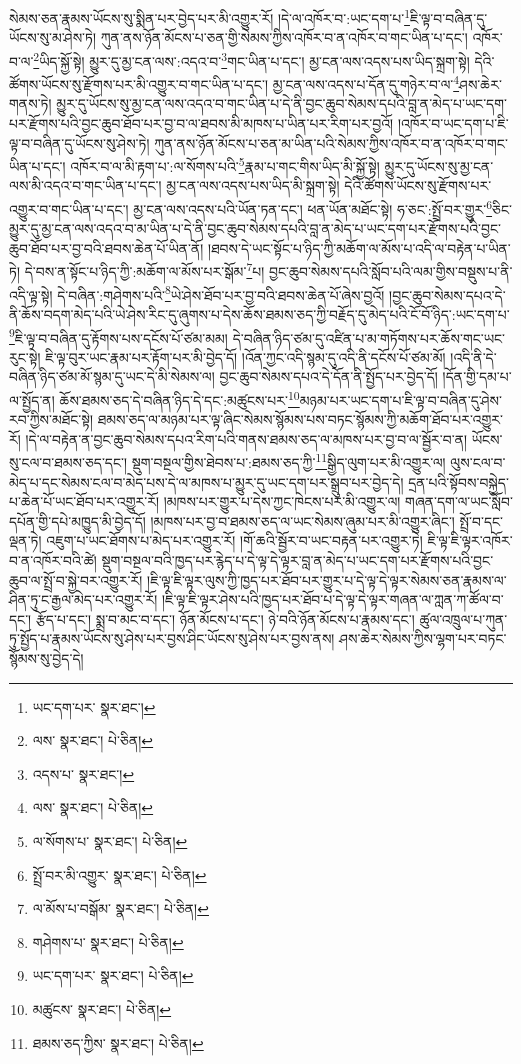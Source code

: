 སེམས་ཅན་རྣམས་ཡོངས་སུ་སྨིན་པར་བྱེད་པར་མི་འགྱུར་རོ། །དེ་ལ་འཁོར་བ་:ཡང་དག་པ་\footnote{ཡང་དག་པར་  སྣར་ཐང་། }ཇི་ལྟ་བ་བཞིན་དུ་ཡོངས་སུ་མ་ཤེས་ཏེ། ཀུན་ནས་ཉོན་མོངས་པ་ཅན་གྱི་སེམས་ཀྱིས་འཁོར་བ་ན་འཁོར་བ་གང་ཡིན་པ་དང་། འཁོར་བ་ལ་\footnote{ལས་  སྣར་ཐང་།  པེ་ཅིན། }ཡིད་སྐྱོ་སྟེ། མྱུར་དུ་མྱ་ངན་ལས་:འདའ་བ་\footnote{འདས་པ་  སྣར་ཐང་། }གང་ཡིན་པ་དང་། མྱ་ངན་ལས་འདས་པས་ཡིད་སྐྲག་སྟེ། དེའི་ཚོགས་ཡོངས་སུ་རྫོགས་པར་མི་འགྱུར་བ་གང་ཡིན་པ་དང་། མྱ་ངན་ལས་འདས་པ་དོན་དུ་གཉེར་བ་ལ་\footnote{ལས་  སྣར་ཐང་།  པེ་ཅིན། }ཤས་ཆེར་གནས་ཏེ། མྱུར་དུ་ཡོངས་སུ་མྱ་ངན་ལས་འདའ་བ་གང་ཡིན་པ་དེ་ནི་བྱང་ཆུབ་སེམས་དཔའི་བླ་ན་མེད་པ་ཡང་དག་པར་རྫོགས་པའི་བྱང་ཆུབ་ཐོབ་པར་བྱ་བ་ལ་ཐབས་མི་མཁས་པ་ཡིན་པར་རིག་པར་བྱའོ། །འཁོར་བ་ཡང་དག་པ་ཇི་ལྟ་བ་བཞིན་དུ་ཡོངས་སུ་ཤེས་ཏེ། ཀུན་ནས་ཉོན་མོངས་པ་ཅན་མ་ཡིན་པའི་སེམས་ཀྱིས་འཁོར་བ་ན་འཁོར་བ་གང་ཡིན་པ་དང་། འཁོར་བ་ལ་མི་རྟག་པ་:ལ་སོགས་པའི་\footnote{ལ་སོགས་པ་  སྣར་ཐང་།  པེ་ཅིན། }རྣམ་པ་གང་གིས་ཡིད་མི་སྐྱོ་སྟེ། མྱུར་དུ་ཡོངས་སུ་མྱ་ངན་ལས་མི་འདའ་བ་གང་ཡིན་པ་དང་། མྱ་ངན་ལས་འདས་པས་ཡིད་མི་སྐྲག་སྟེ། དེའི་ཚོགས་ཡོངས་སུ་རྫོགས་པར་འགྱུར་བ་གང་ཡིན་པ་དང་། མྱ་ངན་ལས་འདས་པའི་ཡོན་ཏན་དང་། ཕན་ཡོན་མཐོང་སྟེ། ཧ་ཅང་:སྤྲོ་བར་གྱུར་\footnote{སྤྲོ་བར་མི་འགྱུར་  སྣར་ཐང་།  པེ་ཅིན། }ཅིང་མྱུར་དུ་མྱ་ངན་ལས་འདའ་བ་མ་ཡིན་པ་དེ་ནི་བྱང་ཆུབ་སེམས་དཔའི་བླ་ན་མེད་པ་ཡང་དག་པར་རྫོགས་པའི་བྱང་ཆུབ་ཐོབ་པར་བྱ་བའི་ཐབས་ཆེན་པོ་ཡིན་ནོ། །ཐབས་དེ་ཡང་སྟོང་པ་ཉིད་ཀྱི་མཆོག་ལ་མོས་པ་འདི་ལ་བརྟེན་པ་ཡིན་ཏེ། དེ་བས་ན་སྟོང་པ་ཉིད་ཀྱི་:མཆོག་ལ་མོས་པར་སྒོམ་\footnote{ལ་མོས་པ་བསྒོམ་  སྣར་ཐང་།  པེ་ཅིན། }པ། བྱང་ཆུབ་སེམས་དཔའི་སློབ་པའི་ལམ་གྱིས་བསྡུས་པ་ནི་འདི་ལྟ་སྟེ། དེ་བཞིན་:གཤེགས་པའི་\footnote{གཤེགས་པ་  སྣར་ཐང་།  པེ་ཅིན། }ཡེ་ཤེས་ཐོབ་པར་བྱ་བའི་ཐབས་ཆེན་པོ་ཞེས་བྱའོ། །བྱང་ཆུབ་སེམས་དཔའ་དེ་ནི་ཆོས་བདག་མེད་པའི་ཡེ་ཤེས་རིང་དུ་ཞུགས་པ་དེས་ཆོས་ཐམས་ཅད་ཀྱི་བརྗོད་དུ་མེད་པའི་ངོ་བོ་ཉིད་:ཡང་དག་པ་\footnote{ཡང་དག་པར་  སྣར་ཐང་།  པེ་ཅིན། }ཇི་ལྟ་བ་བཞིན་དུ་རྟོགས་པས་དངོས་པོ་ཙམ་མམ། དེ་བཞིན་ཉིད་ཙམ་དུ་འཛིན་པ་མ་གཏོགས་པར་ཆོས་གང་ཡང་རུང་སྟེ། ཇི་ལྟ་བུར་ཡང་རྣམ་པར་རྟོག་པར་མི་བྱེད་དོ། །འོན་ཀྱང་འདི་སྙམ་དུ་འདི་ནི་དངོས་པོ་ཙམ་མོ། །འདི་ནི་དེ་བཞིན་ཉིད་ཙམ་མོ་སྙམ་དུ་ཡང་དེ་མི་སེམས་ལ། བྱང་ཆུབ་སེམས་དཔའ་དེ་དོན་ནི་སྤྱོད་པར་བྱེད་དོ། །དོན་གྱི་དམ་པ་ལ་སྤྱོད་ན། ཆོས་ཐམས་ཅད་དེ་བཞིན་ཉིད་དེ་དང་:མཚུངས་པར་\footnote{མཚུངས་  སྣར་ཐང་།  པེ་ཅིན། }མཉམ་པར་ཡང་དག་པ་ཇི་ལྟ་བ་བཞིན་དུ་ཤེས་རབ་ཀྱིས་མཐོང་སྟེ། ཐམས་ཅད་ལ་མཉམ་པར་ལྟ་ཞིང་སེམས་སྙོམས་པས་བཏང་སྙོམས་ཀྱི་མཆོག་ཐོབ་པར་འགྱུར་རོ། །དེ་ལ་བརྟེན་ན་བྱང་ཆུབ་སེམས་དཔའ་རིག་པའི་གནས་ཐམས་ཅད་ལ་མཁས་པར་བྱ་བ་ལ་སྦྱོར་བ་ན། ཡོངས་སུ་ངལ་བ་ཐམས་ཅད་དང་། སྡུག་བསྔལ་གྱིས་ཐེབས་པ་:ཐམས་ཅད་ཀྱི་\footnote{ཐམས་ཅད་ཀྱིས་  སྣར་ཐང་།  པེ་ཅིན། }སྒྱིད་ལུག་པར་མི་འགྱུར་ལ། ལུས་ངལ་བ་མེད་པ་དང་སེམས་ངལ་བ་མེད་པས་དེ་ལ་མཁས་པ་མྱུར་དུ་ཡང་དག་པར་སྒྲུབ་པར་བྱེད་དེ། དྲན་པའི་སྟོབས་བསྐྱེད་པ་ཆེན་པོ་ཡང་ཐོབ་པར་འགྱུར་རོ། །མཁས་པར་གྱུར་པ་དེས་ཀྱང་ཁེངས་པར་མི་འགྱུར་ལ། གཞན་དག་ལ་ཡང་སློབ་དཔོན་གྱི་དཔེ་མཁྱུད་མི་བྱེད་དོ། །མཁས་པར་བྱ་བ་ཐམས་ཅད་ལ་ཡང་སེམས་ཞུམ་པར་མི་འགྱུར་ཞིང་། སྤྲོ་བ་དང་ལྡན་ཏེ། འཇུག་པ་ཡང་ཐོགས་པ་མེད་པར་འགྱུར་རོ། །གོ་ཆའི་སྦྱོར་བ་ཡང་བརྟན་པར་འགྱུར་ཏེ། ཇི་ལྟ་ཇི་ལྟར་འཁོར་བ་ན་འཁོར་བའི་ཚེ། སྡུག་བསྔལ་བའི་ཁྱད་པར་རྙེད་པ་དེ་ལྟ་དེ་ལྟར་བླ་ན་མེད་པ་ཡང་དག་པར་རྫོགས་པའི་བྱང་ཆུབ་ལ་སྤྲོ་བ་སྐྱེ་བར་འགྱུར་རོ། །ཇི་ལྟ་ཇི་ལྟར་ལུས་ཀྱི་ཁྱད་པར་ཐོབ་པར་གྱུར་པ་དེ་ལྟ་དེ་ལྟར་སེམས་ཅན་རྣམས་ལ་ཤིན་ཏུ་ང་རྒྱལ་མེད་པར་འགྱུར་རོ། །ཇི་ལྟ་ཇི་ལྟར་ཤེས་པའི་ཁྱད་པར་ཐོབ་པ་དེ་ལྟ་དེ་ལྟར་གཞན་ལ་ཀླན་ཀ་ཚོལ་བ་དང་། རྩོད་པ་དང་། སྨྲ་བ་མང་བ་དང་། ཉོན་མོངས་པ་དང་། ཉེ་བའི་ཉོན་མོངས་པ་རྣམས་དང་། ཚུལ་འཁྲུལ་པ་ཀུན་ཏུ་སྤྱོད་པ་རྣམས་ཡོངས་སུ་ཤེས་པར་བྱས་ཤིང་ཡོངས་སུ་ཤེས་པར་བྱས་ནས། ཤས་ཆེར་སེམས་ཀྱིས་ལྷག་པར་བཏང་སྙོམས་སུ་བྱེད་དེ། 